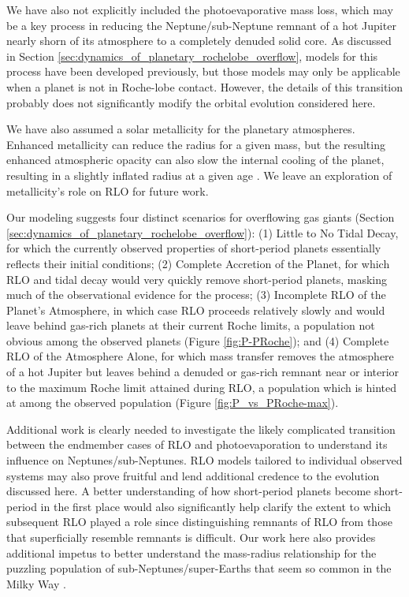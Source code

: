 \documentclass{svjour3}                     %
\begin{document}
We have also not explicitly included the photoevaporative mass loss, which may be a key process in reducing the Neptune/sub-Neptune remnant of a hot Jupiter nearly shorn of its atmosphere to a completely denuded solid core. As discussed in Section \ref{sec:dynamics_of_planetary_rochelobe_overflow}, models for this process have been developed previously, but those models may only be applicable when a planet is not in Roche-lobe contact. However, the details of this transition probably does not significantly modify the orbital evolution considered here.

We have also assumed a solar metallicity for the planetary atmospheres. Enhanced metallicity can reduce the radius for a given mass, but the resulting enhanced atmospheric opacity can also slow the internal cooling of the planet, resulting in a slightly inflated radius at a given age \cite{2007ApJ...661..502B}. We leave an exploration of metallicity's role on RLO for future work.

Our modeling suggests four distinct scenarios for overflowing gas giants (Section \ref{sec:dynamics_of_planetary_rochelobe_overflow}): (1) Little to No Tidal Decay, for which the currently observed properties of short-period planets essentially reflects their initial conditions; (2) Complete Accretion of the Planet, for which RLO and tidal decay would very quickly remove short-period planets, masking much of the observational evidence for the process; (3) Incomplete RLO of the Planet's Atmosphere, in which case RLO proceeds relatively slowly and would leave behind gas-rich planets at their current Roche limits, a population not obvious among the observed planets (Figure \ref{fig:P-PRoche}); and (4) Complete RLO of the Atmosphere Alone, for which mass transfer removes the atmosphere of a hot Jupiter but leaves behind a denuded or gas-rich remnant near or interior to the maximum Roche limit attained during RLO, a population which is hinted at among the observed population (Figure \ref{fig:P_vs_PRoche-max}). 

Additional work is clearly needed to investigate the likely complicated transition between the endmember cases of RLO and photoevaporation to understand its influence on Neptunes/sub-Neptunes. RLO models tailored to individual observed systems may also prove fruitful and lend additional credence to the evolution discussed here. A better understanding of how short-period planets become short-period in the first place would also significantly help clarify the extent to which subsequent RLO played a role since distinguishing remnants of RLO from those that superficially resemble remnants is difficult. Our work here also provides additional impetus to better understand the mass-radius relationship for the puzzling population of sub-Neptunes/super-Earths that seem so common in the Milky Way \cite{2014PNAS..11112655M}. 
\end{document}
